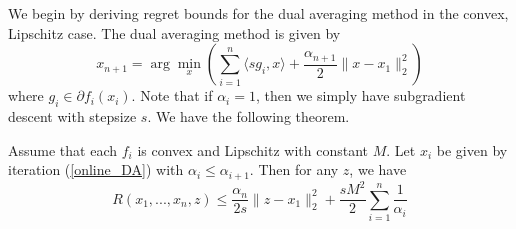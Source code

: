 We begin by deriving regret bounds for the dual averaging method in the convex, Lipschitz case. The dual averaging method
is given by
\begin{equation} \label{online_DA}
 x_{n + 1} = \arg\min_x \left(\displaystyle\sum_{i = 1}^n \langle sg_i, x\rangle + \frac{\alpha_{n+1}}{2}\|x - x_1\|_2^2\right)
\end{equation}
where $g_i\in \partial f_i(x_i)$. Note that if $\alpha_i = 1$, then we simply have subgradient descent with
stepsize $s$. We have the following theorem.
\begin{theorem}
 Assume that each $f_i$ is convex and Lipschitz with constant $M$. Let $x_i$ be given by iteration (\ref{online_DA})
 with $\alpha_i \leq \alpha_{i+1}$.
 Then for any $z$, we have
 \begin{equation}
  R(x_1,...,x_n,z) \leq \frac{\alpha_n}{2s} \|z - x_1\|_2^2 + \frac{sM^2}{2}\displaystyle\sum_{i = 1}^n \frac{1}{\alpha_i}
 \end{equation}
 \end{theorem}
